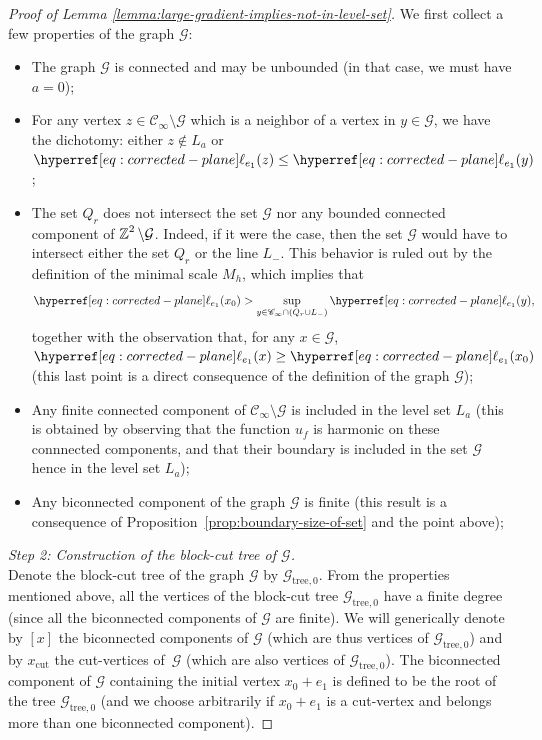 \documentclass[12pt]{amsart}
\numberwithin{equation}{section}
\begin{document}
\begin{proof}[Proof of Lemma \ref{lemma:large-gradient-implies-not-in-level-set}]
		We first collect a few properties of the graph $\mathcal{G}$:
		\begin{itemize}
			\item The graph $\mathcal{G}$ is connected and may be unbounded (in that case, we must have $a = 0$);
			\item For any vertex $z \in \mathscr{C}_\infty \setminus \mathcal{G}$ which is a neighbor of a vertex in $y \in \mathcal{G}$, we have the dichotomy: either $z \notin L_a$ or $\ellp{e_1}(z) \leq \ellp{e_1} (y)$;
			\item The set $Q_r$ does not intersect the set $\mathcal{G}$ nor any bounded connected component of $\operatorname{\mathbb{Z}}^2 \setminus \mathcal{G}$. Indeed, if it were the case, then the set $\mathcal{G}$ would have to intersect either the set $Q_r$ or the line $L_-$. This behavior is ruled out by the definition of the minimal scale $M_h$, which implies that 
			$$\ellp{e_1}(x_0) > \sup_{y \in \mathscr{C}_\infty \cap ( Q_r \cup L_-)} \ellp{e_1} (y),$$
			together with the observation that, for any $x \in \mathcal{G}$, $\ellp{e_1}(x) \geq \ellp{e_1}(x_0)$ (this last point is a direct consequence of the definition of the graph $\mathcal{G}$);
			\item Any finite connected component of $\mathscr{C}_\infty \setminus \mathcal{G}$ is included in the level set $L_a$ (this is obtained by observing that the function $u_f$ is harmonic on these connnected components, and that their boundary is included in the set $\mathcal{G}$ hence in the level set $L_a$);
			\item Any biconnected component of the graph $\mathcal{G}$ is finite (this result is a consequence of Proposition~\ref{prop:boundary-size-of-set} and the point above);
		\end{itemize}
		\medskip
		
		{\it Step 2: Construction of the block-cut tree of $\mathcal{G}$.} \\ 
		Denote the block-cut tree of the graph $\mathcal{G}$ by $\mathcal{G}_{\mathrm{tree}, 0}$. From the properties mentioned above, all the vertices of the block-cut tree $\mathcal{G}_{\mathrm{tree},0}$ have a finite degree (since all the biconnected components of $\mathcal{G}$ are finite). We will generically denote by $[x]$ the biconnected components of $\mathcal{G}$ (which are thus vertices of $\mathcal{G}_{\mathrm{tree},0}$) and by $x_{\mathrm{cut}}$ the cut-vertices of~$\mathcal{G}$ (which are also vertices of $\mathcal{G}_{\mathrm{tree},0}$). The biconnected component of $\mathcal{G}$ containing the initial vertex $x_0+e_1$ is defined to be the root of the tree $\mathcal{G}_{\mathrm{tree},0}$ (and we choose arbitrarily if $x_0 + e_1$ is a cut-vertex and belongs more than one biconnected component). 
		

\end{proof}
\end{document}
